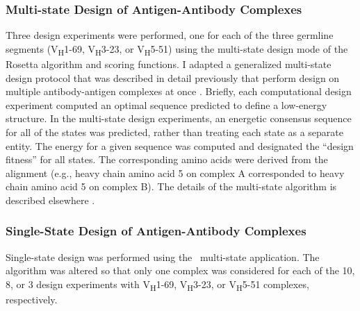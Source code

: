 \subsubsection{Multi-state Design of Antigen-Antibody Complexes}
Three design experiments were performed, one for each of the three germline segments (V\textsubscript{H}1-69, V\textsubscript{H}3-23, or V\textsubscript{H}5-51) using the multi-state design mode of the Rosetta algorithm and scoring functions. I adapted a generalized multi-state design protocol that was described in detail previously that perform design on multiple antibody-antigen complexes at once \citep{LeaverFay:2011ji}. Briefly, each computational design experiment computed an optimal sequence predicted to define a low-energy structure.  In the multi-state design experiments, an energetic consensus sequence for all of the states was predicted, rather than treating each state as a separate entity. The energy for a given sequence was computed and designated the ``design fitness'' for all states. The corresponding amino acids were derived from the alignment (e.g., heavy chain amino acid 5 on complex A corresponded to heavy chain amino acid 5 on complex B). The details of the multi-state algorithm is described elsewhere \citep{LeaverFay:2011ji}.

\subsubsection{Single-State Design of Antigen-Antibody Complexes}
Single-state design was performed using the \rosetta~multi-state application. The algorithm was altered so that only one complex was considered for each of the 10, 8, or 3 design experiments with V\textsubscript{H}1-69, V\textsubscript{H}3-23, or V\textsubscript{H}5-51 complexes, respectively.

